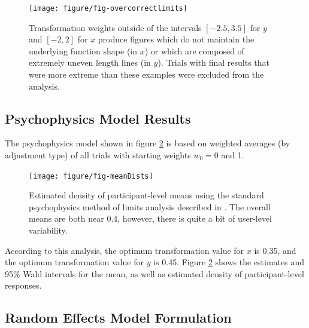 \documentclass[12pt]{article}\usepackage[]{graphicx}\usepackage[]{color}
\newenvironment{knitrout}{}{} %
\begin{document}
\begin{appendix}
\begin{figure}[htbp]\centering
\texttt{[image: figure/fig-overcorrectlimits]}
\caption[ Overcorrected transformations excluded from the analysis]{Transformation weights outside of the intervals $[\ensuremath{-2.5}, 3.5]$ for $y$ and $[\ensuremath{-2}, 2]$ for $x$  produce figures which do not maintain the underlying function shape (in $x$) or which are composed of extremely uneven length lines (in $y$). Trials with final results that were more extreme than these examples were excluded from the analysis.}
\label{fig:overtransform}
\end{figure}

\subsection{Psychophysics Model Results}\label{psychophysics}
The psychophysics model shown in figure \ref{fig:psycho} is based on  weighted averages (by adjustment type) of all trials with starting weights $w_0 = 0$ and 1.

\begin{figure}\centering
\caption{Estimated density of participant-level means using the standard psychophysics method of limits analysis described in \citet{goldstein}. The overall means are both near 0.4, however, there is quite a bit of user-level variability.}\label{fig:psycho}
\begin{knitrout}
\color{fgcolor}

{\centering \texttt{[image: figure/fig-meanDists]} 

}



\end{knitrout}
\end{figure}



According to this analysis, the optimum transformation value for $x$ is 0.35, and the optimum transformation value for $y$ is 0.45. Figure \ref{fig:psycho} shows the estimates and 95\% Wald intervals for the mean, as well as estimated density of participant-level responses. %
\subsection{Random Effects Model Formulation}


\end{appendix}
\end{document}
